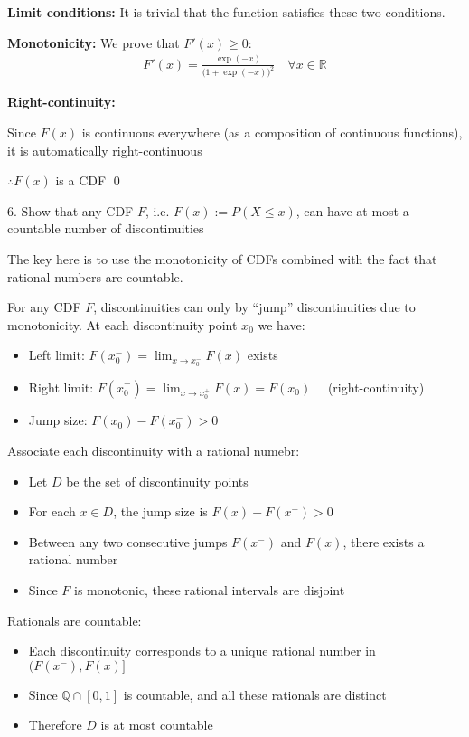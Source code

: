 \documentclass[10pt]{article}
\begin{document}
\textbf{Limit conditions:} It is trivial that the function satisfies these two conditions.

\textbf{Monotonicity:} We prove that $F'(x) \geq 0$:
\begin{gather*}
    F'(x) = \frac{\exp(-x)}{\big(1 + \exp(-x)\big)^2} \quad\forall x \in \mathbb{R}
\end{gather*}

\textbf{Right-continuity:} 

Since $F(x)$ is continuous everywhere (as a composition of continuous functions), it is automatically right-continuous

$\therefore F(x)$ is a CDF \qed 

\newpage

6. Show that any CDF $F$, i.e. $F(x) := P(X \leq x)$, can have at most a countable number of discontinuities

The key here is to use the monotonicity of CDFs combined with the fact that rational numbers are countable.

For any CDF $F$, discontinuities can only by ``jump'' discontinuities due to monotonicity. 
At each discontinuity point $x_0$ we have:

\begin{itemize}
    \item Left limit: $F(x_0^-) = \lim_{x \to x_0^-}F(x)$ exists
    \item Right limit: $F(x_0^+) = \lim_{x \to x_0^+} F(x) = F(x_0)\quad$ (right-continuity)
    \item Jump size: $F(x_0) - F(x_0^-) > 0$
\end{itemize}

\hfill

Associate each discontinuity with a rational numebr: 
\begin{itemize}
    \item Let $D$ be the set of discontinuity points
    \item For each $x \in D$, the jump size is $F(x) - F(x^-) > 0$
    \item Between any two consecutive jumps $F(x^-)$ and $F(x)$, there exists a rational number
    \item Since $F$ is monotonic, these rational intervals are disjoint
\end{itemize}

\hfill 

Rationals are countable: 
\begin{itemize}
    \item Each discontinuity corresponds to a unique rational number in $(F(x^-), F(x)]$
    \item Since $\mathbb{Q} \cap [0, 1]$ is countable, and all these rationals are distinct
    \item Therefore $D$ is at most countable
\end{itemize}
\end{document}
